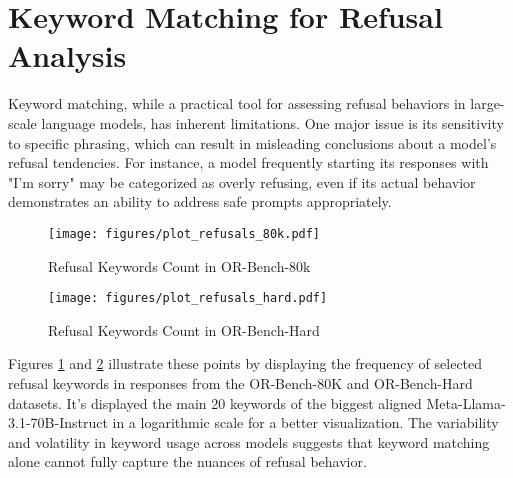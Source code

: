 \section{Keyword Matching for Refusal Analysis}\label{app:refusal_sentences}

Keyword matching, while a practical tool for assessing refusal behaviors in large-scale language models, has inherent limitations. One major issue is its sensitivity to specific phrasing, which can result in misleading conclusions about a model's refusal tendencies. For instance, a model frequently starting its responses with "I'm sorry" may be categorized as overly refusing, even if its actual behavior demonstrates an ability to address safe prompts appropriately.

\begin{figure}[ht]
    \centering
    \texttt{[image: figures/plot\_refusals\_80k.pdf]}
    \caption{Refusal Keywords Count in OR-Bench-80k}
    \label{fig:keywords-80k}
\end{figure}
\begin{figure}[ht]
    \centering
    \texttt{[image: figures/plot\_refusals\_hard.pdf]}
    \caption{Refusal Keywords Count in OR-Bench-Hard}
    \label{fig:keywords-hard}
\end{figure}

Figures \ref{fig:keywords-80k} and \ref{fig:keywords-hard} illustrate these points by displaying the frequency of selected refusal keywords in responses from the OR-Bench-80K and OR-Bench-Hard datasets. It's displayed the main 20 keywords of the biggest aligned Meta-Llama-3.1-70B-Instruct in a logarithmic scale for a better visualization. The variability and volatility in keyword usage across models suggests that keyword matching alone cannot fully capture the nuances of refusal behavior. 


